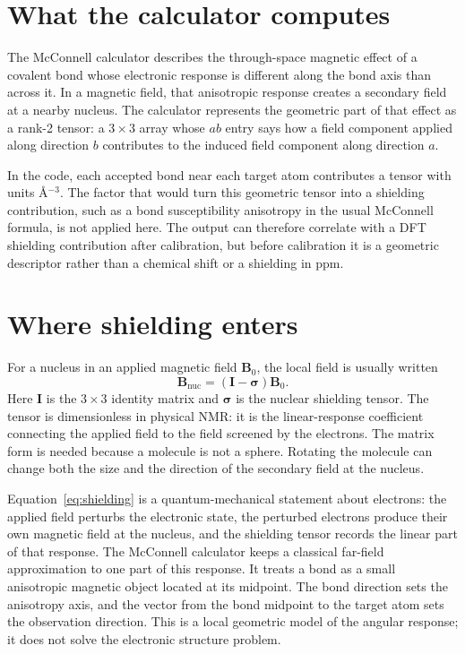 \documentclass[11pt]{article}
\begin{document}

\section{What the calculator computes}

The McConnell calculator describes the through-space magnetic effect of a
covalent bond whose electronic response is different along the bond axis than
across it. In a magnetic field, that anisotropic response creates a secondary
field at a nearby nucleus. The calculator represents the geometric part of that
effect as a rank-2 tensor: a \(3\times 3\) array whose \(ab\) entry says how a
field component applied along direction \(b\) contributes to the induced field
component along direction \(a\).

In the code, each accepted bond near each target atom contributes a tensor with
units \(\si{\angstrom^{-3}}\). The factor that would turn this geometric tensor
into a shielding contribution, such as a bond susceptibility anisotropy in the
usual McConnell formula, is not applied here. The output can therefore correlate
with a DFT shielding contribution after calibration, but before calibration it is
a geometric descriptor rather than a chemical shift or a shielding in ppm.

\section{Where shielding enters}

For a nucleus in an applied magnetic field \(\bm B_0\), the local field is
usually written
\begin{equation}
  \bm B_{\mathrm{nuc}} = (\bm I - \bm\sigma)\bm B_0 .
  \label{eq:shielding}
\end{equation}
Here \(\bm I\) is the \(3\times 3\) identity matrix and
\(\bm\sigma\) is the nuclear shielding tensor. The tensor is dimensionless in
physical NMR: it is the linear-response coefficient connecting the applied
field to the field screened by the electrons. The matrix form is needed because
a molecule is not a sphere. Rotating the molecule can change both the size and
the direction of the secondary field at the nucleus.

Equation~\eqref{eq:shielding} is a quantum-mechanical statement about electrons:
the applied field perturbs the electronic state, the perturbed electrons produce
their own magnetic field at the nucleus, and the shielding tensor records the
linear part of that response. The McConnell calculator keeps a classical
far-field approximation to one part of this response. It treats a bond as a
small anisotropic magnetic object located at its midpoint. The bond direction
sets the anisotropy axis, and the vector from the bond midpoint to the target
atom sets the observation direction. This is a local geometric model of the
angular response; it does not solve the electronic structure problem.
\end{document}
